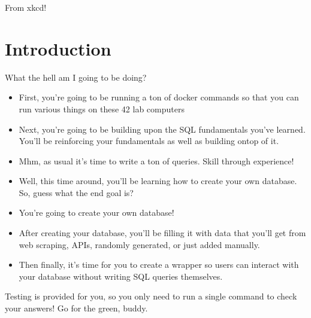 \documentclass{42-en}
\begin{document}
	    From xkcd! \\
	    	\newpage 	

\chapter{Introduction}

	What the hell am I going to be doing?

	\begin{itemize}\itemsep1pt
		\item First, you're going to be running a ton of docker commands 
			so that you can run various things on these 42 lab computers
		\item Next, you're going to be building upon the SQL fundamentals you've learned. 
			You'll be reinforcing your fundamentals as well as building ontop of it. 
		\item Mhm, as usual it's time to write a ton of queries. Skill through experience!   
		\item Well, this time around, you'll be learning how to create your own database. 
			So, guess what the end goal is?
		\item You're going to create your own database! 
		\item After creating your database, you'll be filling it with data that you'll get 
			from web scraping, APIs, randomly generated, or just added manually.
		\item Then finally, it's time for you to create a wrapper so users can interact 
			with your database without writing SQL queries themselves. 
	\end{itemize}


	Testing is provided for you, so you only need to run a single command to 
	check your answers! Go for the green, buddy. 

\end{document}

